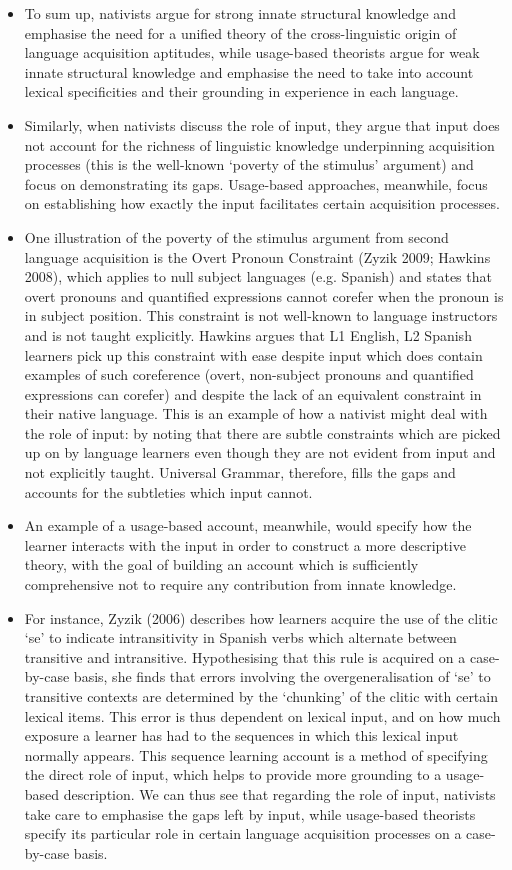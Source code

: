 \documentclass{article}
\begin{document}
\begin{itemize}
    \item To sum up, nativists argue for strong innate structural knowledge and emphasise the need for a unified theory of the cross-linguistic origin of language acquisition aptitudes, while usage-based theorists argue for weak innate structural knowledge and emphasise the need to take into account lexical specificities and their grounding in experience in each language.
    \item Similarly, when nativists discuss the role of input, they argue that input does not account for the richness of linguistic knowledge underpinning acquisition processes (this is the well-known ‘poverty of the stimulus’ argument) and focus on demonstrating its gaps. Usage-based approaches, meanwhile, focus on establishing how exactly the input facilitates certain acquisition processes. 
    \item One illustration of the poverty of the stimulus argument from second language acquisition is the Overt Pronoun Constraint (Zyzik 2009; Hawkins 2008), which applies to null subject languages (e.g. Spanish) and states that overt pronouns and quantified expressions cannot corefer when the pronoun is in subject position. This constraint is not well-known to language instructors and is not taught explicitly. Hawkins argues that L1 English, L2 Spanish learners pick up this constraint with ease despite input which does contain examples of such coreference (overt, non-subject pronouns and quantified expressions can corefer) and despite the lack of an equivalent constraint in their native language. This is an example of how a nativist might deal with the role of input: by noting that there are subtle constraints which are picked up on by language learners even though they are not evident from input and not explicitly taught. Universal Grammar, therefore, fills the gaps and accounts for the subtleties which input cannot.
    \item An example of a usage-based account, meanwhile, would specify how the learner interacts with the input in order to construct a more descriptive theory, with the goal of building an account which is sufficiently comprehensive not to require any contribution from innate knowledge. 
    \item For instance, Zyzik (2006) describes how learners acquire the use of the clitic ‘se’ to indicate intransitivity in Spanish verbs which alternate between transitive and intransitive. Hypothesising that this rule is acquired on a case-by-case basis, she finds that errors involving the overgeneralisation of ‘se’ to transitive contexts are determined by the ‘chunking’ of the clitic with certain lexical items. This error is thus dependent on lexical input, and on how much exposure a learner has had to the sequences in which this lexical input normally appears. This sequence learning account is a method of specifying the direct role of input, which helps to provide more grounding to a usage-based description. We can thus see that regarding the role of input, nativists take care to emphasise the gaps left by input, while usage-based theorists specify its particular role in certain language acquisition processes on a case-by-case basis. 

\end{itemize}
\end{document}
